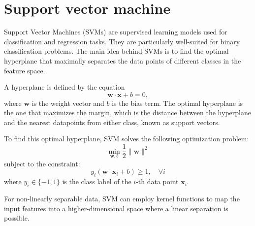 \section{Support vector machine}


Support Vector Machines (SVMs) are supervised learning models used for classification and regression tasks. They are particularly well-suited for binary classification problems. The main idea behind SVMs is to find the optimal hyperplane that maximally separates the data points of different classes in the feature space.

A hyperplane is defined by the equation
\[
	\mathbf{w} \cdot \mathbf{x} + b = 0,
\]
where \( \mathbf{w} \) is the weight vector and \( b \) is the bias term. The optimal hyperplane is the one that maximizes the margin, which is the distance between the hyperplane and the nearest datapoints from either class, known as support vectors.

To find this optimal hyperplane, SVM solves the following optimization problem:
\[
	\min_{\mathbf{w}, b} \frac{1}{2} \|\mathbf{w}\|^2
\]
subject to the constraint:
\[
	y_i (\mathbf{w} \cdot \mathbf{x}_i + b) \geq 1, \quad \forall i
\]
where \( y_i \in \{-1, 1\}\) is the class label of the \( i \)-th data point \( \mathbf{x}_i \).

For non-linearly separable data, SVM can employ kernel functions to map the input features into a higher-dimensional space where a linear separation is possible.


